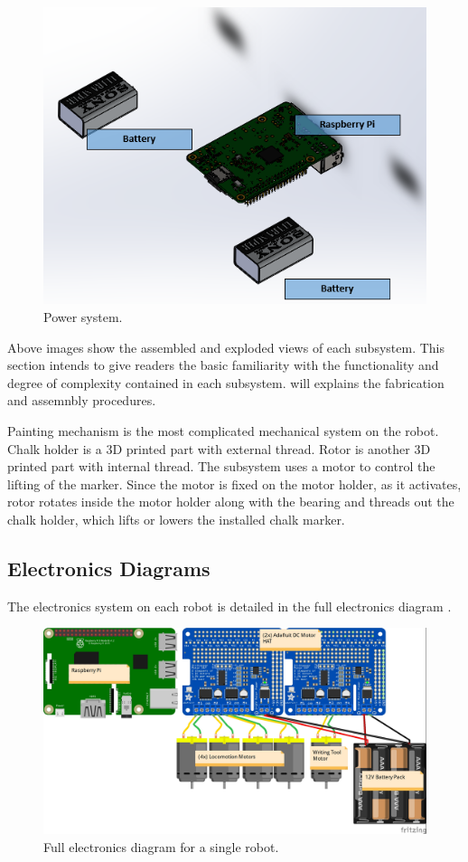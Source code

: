 \begin{figure}[h!]
\centering
\includegraphics[width=0.6\columnwidth]{hardware/CAD/PowerSystem/Power.PNG}
\caption{Power system.}
\label{fig:power-diagram}
\end{figure}

Above images show the assembled and exploded views of each subsystem. This section intends to give readers the basic familiarity with the functionality and degree of complexity contained in each subsystem.  will explains the fabrication and assemnbly procedures.

Painting mechanism is the most complicated mechanical system on the robot. Chalk holder is a 3D printed part with external thread. Rotor is another 3D printed part with internal thread. The subsystem uses a motor to control the lifting of the marker. Since the motor is fixed on the motor holder, as it activates, rotor rotates inside the motor holder along with the bearing and threads out the chalk holder, which lifts or lowers the installed chalk marker.

\clearpage

\subsection{Electronics Diagrams}
\label{sec:electronics_diagrams}

The electronics system on each robot is detailed in the full electronics diagram .

\begin{figure}
\centering
\includegraphics[width=0.9\columnwidth]{figs/wiring-diagram.jpg}
\caption{Full electronics diagram for a single robot.}
\label{fig:electronics-diagram}
\end{figure}

